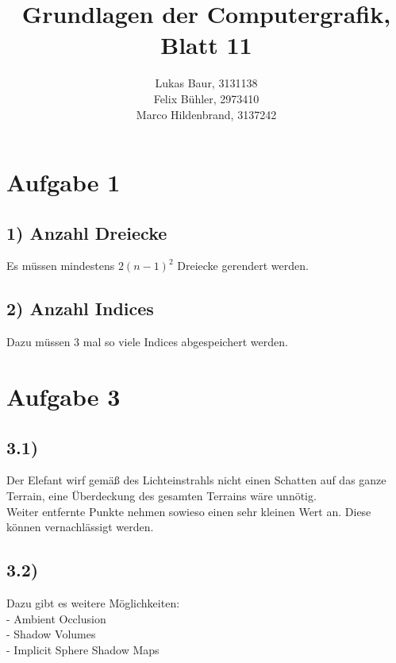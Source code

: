 \documentclass[12pt,pdftex,a4paper]{article}
\begin{document}
\title{ Grundlagen der Computergrafik,\\ Blatt 11}
\author{Lukas Baur, 3131138\\
		Felix Bühler, 2973410\\
		Marco Hildenbrand, 3137242}
\maketitle
\section*{Aufgabe 1}
\subsection*{1) Anzahl Dreiecke}

Es müssen mindestens $2(n-1)^{2}$ Dreiecke gerendert werden.
\subsection*{2) Anzahl Indices}

Dazu müssen 3 mal so viele Indices abgespeichert werden.

\section*{Aufgabe 3}
\subsection*{3.1)}
Der Elefant wirf gemäß des Lichteinstrahls nicht einen Schatten auf das ganze Terrain, eine Überdeckung des gesamten Terrains wäre unnötig.\\
Weiter entfernte Punkte nehmen sowieso einen sehr kleinen Wert an. Diese können vernachlässigt werden.
\subsection*{3.2)}
Dazu gibt es weitere Möglichkeiten:\\
- Ambient Occlusion \\
- Shadow Volumes \\
- Implicit Sphere Shadow Maps \\
\end{document}
